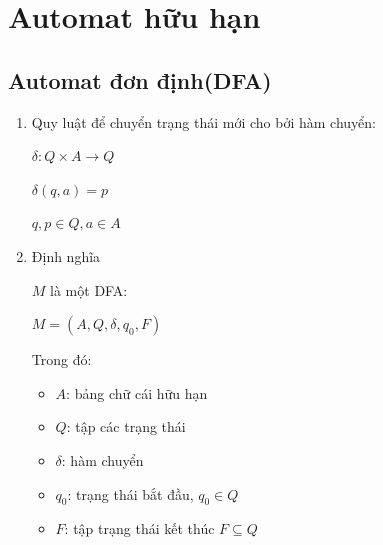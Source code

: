 \documentclass[14pt]{extreport}
\begin{document}
\section{Automat hữu hạn}
\subsection{Automat đơn định(DFA)}
\begin{enumerate}
\item Quy luật để chuyển trạng thái mới cho bởi hàm chuyển:

$\delta: Q \times A\rightarrow Q$

$\delta(q,a)=p$

$q,p\in Q,a\in A$
\item Định nghĩa

$M$ là một DFA:
\begin{center}
$M=\left(A,Q,\delta,q_0,F\right)$
\end{center}
Trong đó:
\begin{itemize}
\item $A$: bảng chữ cái hữu hạn
\item $Q$: tập các trạng thái
\item $\delta$: hàm chuyển
\item $q_0$: trạng thái bắt đầu, $q_0 \in Q$
\item $F$: tập trạng thái kết thúc $F\subseteq Q$
\end{itemize}
\end{enumerate}
\end{document}
